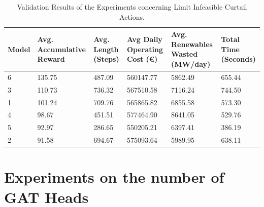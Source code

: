 \begin{table}[ht]
	\centering
	\begin{tabularx}{\textwidth}{|l|X|X|X|X|X|}
		\hline
		\textbf{Model} & \textbf{Avg. Accumulative Reward}& \textbf{Avg. Length (Steps)} & \textbf{Avg Daily Operating Cost (€)} & \textbf{Avg. Renewables Wasted (MW/day)} & \textbf{Total Time (Seconds)}\\
		\hline
		6 & 135.75 & 487.09 & 560147.77 & 5862.49 & 655.44 \\
		3 & 110.73 & 736.32 & 567510.58 & 7116.24 & 744.50 \\
		1 & 101.24 & 709.76 & 565865.82 & 6855.58 & 573.30 \\
		4 & 98.67 & 451.51 & 577464.90 & 8641.05 & 529.76 \\
		5 & 92.97 & 286.65 & 550205.21 & 6397.41 & 386.19 \\
		2 & 91.58 & 694.67 & 575093.64 & 5989.95 & 638.11 \\
		\hline
	\end{tabularx}
	\caption{Validation Results of the Experiments concerning Limit Infeasible Curtail Actions.}
	\label{fig:curtail-val}
\end{table}


\section{Experiments on the number of \ac{GAT} Heads}

